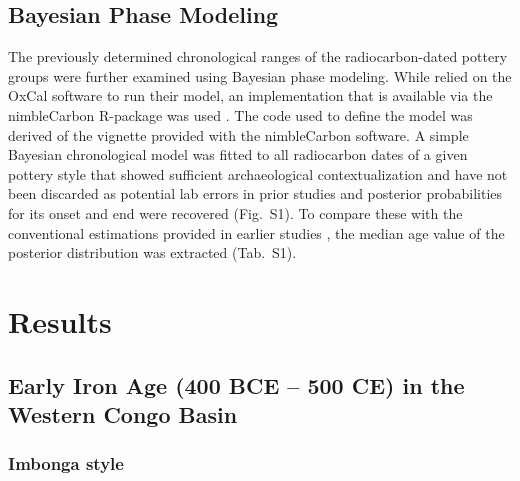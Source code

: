 \documentclass[smallextended,natbib]{svjour3}       %
\begin{document}
\subsection*{Bayesian Phase Modeling}

The previously determined chronological ranges of the radiocarbon-dated pottery groups \citep{Seidensticker.2021e, Seidensticker.2021} were further examined using Bayesian phase modeling. While \citet{Crema.2020a} relied on the OxCal software to run their model, an implementation that is available via the nimbleCarbon R-package was used \citep{Crema.2021a,Crema.2021b}. The code used to define the model was derived of the vignette provided with the nimbleCarbon software. A simple Bayesian chronological model was fitted to all radiocarbon dates of a given pottery style that showed sufficient archaeological contextualization and have not been discarded as potential lab errors in prior studies \citep[9]{Seidensticker.2021} and posterior probabilities for its onset and end were recovered (Fig.~S1). To compare these with the conventional estimations provided in earlier studies \citep[\url{https://github.com/dirkseidensticker/aSCAC};][Data S2]{Seidensticker.2021}, the median age value of the posterior distribution was extracted (Tab.~S1).

\section*{Results}

\subsection*{Early Iron Age (400 BCE – 500 CE) in the Western Congo Basin}

\subsubsection*{Imbonga style}
\end{document}

